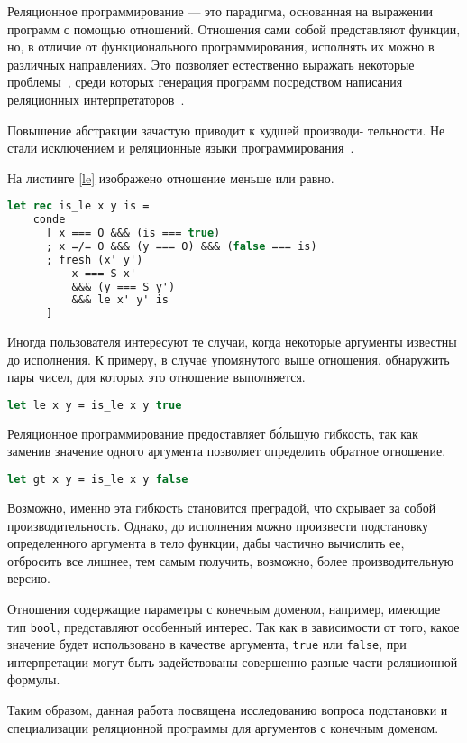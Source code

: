 
Реляционное программирование --- это парадигма, основанная на выражении программ с помощью отношений. Отношения сами собой представляют функции, но, в отличие от функционального программирования, исполнять их можно в различных направлениях. Это позволяет естественно выражать некоторые проблемы~\cite{unapp}, среди которых генерация программ посредством написания реляционных интерпретаторов~\cite{relinter}.

Повышение абстракции зачастую приводит к худшей производи-
тельности. Не стали исключением и реляционные языки программирования~\cite{miniKanren, miniDeduction}.

На листинге \ref{le} изображено отношение меньше или равно.

\begin{lstlisting}[caption=Отношение меньше или равно, language=OCaml, frame=single, label = le]
let rec is_le x y is =
    conde
      [ x === O &&& (is === true)
      ; x =/= O &&& (y === O) &&& (false === is)
      ; fresh (x' y') 
          x === S x' 
          &&& (y === S y')
          &&& le x' y' is
      ]
\end{lstlisting}

Иногда пользователя интересуют те случаи, когда некоторые аргументы известны до исполнения. К примеру, в случае упомянутого выше отношения, обнаружить пары чисел, для которых это отношение выполняется.

\begin{lstlisting}[caption=Отношение меньше или равно, language=OCaml, frame=single, label = le]
    let le x y = is_le x y true
\end{lstlisting}

Реляционное программирование предоставляет б\'ольшую гибкость, так как заменив значение одного аргумента позволяет определить обратное отношение.

\begin{lstlisting}[caption=Отношение меньше или равно, language=OCaml, frame=single, label = le]
    let gt x y = is_le x y false
\end{lstlisting}

Возможно, именно эта гибкость становится преградой, что скрывает за собой производительность. Однако, до исполнения можно произвести подстановку определенного аргумента в тело функции, дабы частично вычислить ее, отбросить все лишнее, тем самым получить, возможно, более производительную версию.

Отношения содержащие параметры с конечным доменом, например, имеющие тип \verb|bool|, представляют особенный интерес. Так как в зависимости от того, какое значение будет использовано в качестве аргумента, \verb|true| или \verb|false|, при интерпретации могут быть задействованы совершенно разные части реляционной формулы.

Таким образом, данная работа посвящена исследованию вопроса подстановки и специализации реляционной программы для аргументов с конечным доменом.

